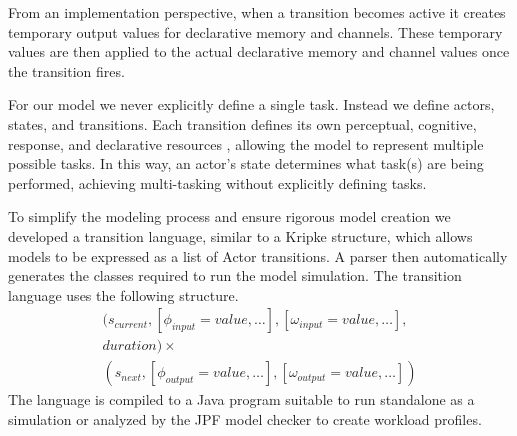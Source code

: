 From an implementation perspective, when a transition becomes active it creates temporary
output values for declarative memory and channels.  These temporary values are
then applied to the actual declarative memory and channel values once the transition fires.

For our model we never explicitly define a single task.  Instead
we define actors, states, and transitions.  Each transition defines its own
perceptual, cognitive, response, and declarative resources \cite{salvucci2008threaded}, allowing the model to represent multiple possible tasks.  In this way, an actor's state
determines what task(s) are being performed, achieving multi-tasking without
explicitly defining tasks. 



To simplify the modeling process and ensure rigorous model creation we
developed a transition language, similar to a Kripke structure, which allows
models to be expressed as a list of Actor transitions.  A parser then
automatically generates the classes required to run the model simulation.
The transition language uses the following structure.
\begin{equation}
\begin{split}
(s_{current}, [\phi_{input} = value,\ldots], [\omega_{input} = value,\ldots],\\
duration) \times \\
(s_{next}, [\phi_{output} =
value,\ldots], [\omega_{output} = value,\ldots])
\end{split}
\end{equation}
\noindent The language is compiled to a Java program suitable to run standalone
as a simulation or analyzed by the JPF model checker to create
workload profiles.
